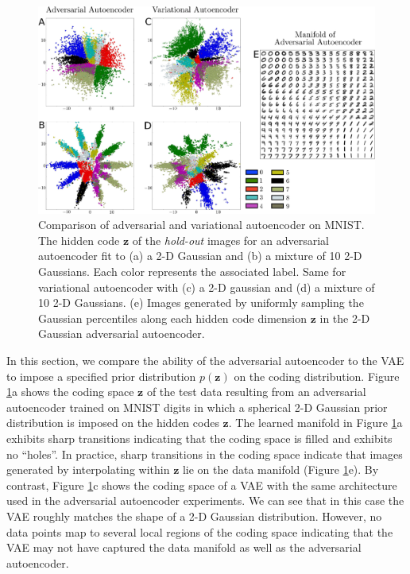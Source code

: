 \documentclass{article}
\begin{document}
\begin{figure}[t]
\centering\includegraphics[scale=.13]{adv_vae}
\caption{\label{fig_mnist}Comparison of adversarial and variational autoencoder on MNIST. The hidden code $\mathbf{z}$ of the \emph{hold-out} images for an adversarial autoencoder fit to (a) a 2-D Gaussian and (b) a mixture of 10 2-D Gaussians. Each color represents the associated label. Same for variational autoencoder with (c) a 2-D gaussian and (d) a mixture of 10 2-D Gaussians. (e) Images generated by uniformly sampling the Gaussian percentiles along each hidden code dimension $\mathbf{z}$ in the 2-D Gaussian adversarial autoencoder.}
\end{figure}

In this section, we compare the ability of the adversarial autoencoder to the VAE to impose a specified prior distribution $p(\mathbf{z})$ on the coding distribution.
Figure \ref{fig_mnist}a shows the coding space $\mathbf{z}$ of the test data resulting from an adversarial autoencoder trained on MNIST digits in which a
spherical 2-D Gaussian prior distribution is imposed on the hidden codes $\mathbf{z}$.
The learned manifold in Figure \ref{fig_mnist}a exhibits sharp transitions indicating that the coding space is filled and exhibits no ``holes''.
In practice, sharp transitions in the coding space indicate that images generated by interpolating within $\mathbf{z}$ lie on the data manifold (Figure \ref{fig_mnist}e).
By contrast, Figure \ref{fig_mnist}c shows the coding space of a VAE with the same architecture used in the adversarial autoencoder experiments.
We can see that in this case the VAE roughly matches the shape of a 2-D Gaussian distribution.
However, no data points map to several local regions of the coding space indicating that the VAE may not have captured the data manifold
as well as the adversarial autoencoder.
\end{document}
